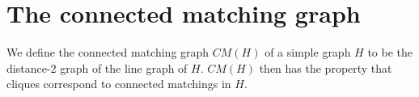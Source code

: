 %
%


\section{The connected matching graph}

We define the connected matching graph $CM(H)$ of a simple graph $H$ to be the distance-2 graph of the line graph of $H$.  $CM(H)$ then has the property that cliques correspond to connected matchings in $H$.




